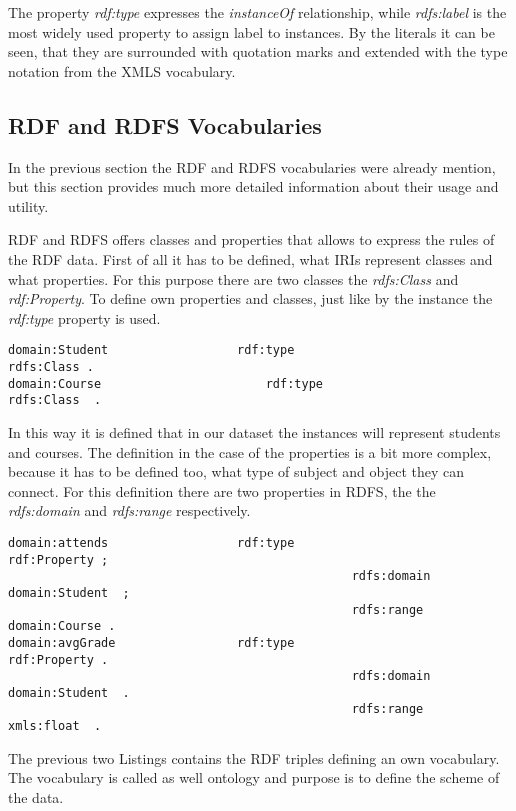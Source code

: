The property \textit{rdf:type} expresses the \textit{instanceOf} relationship, while \textit{rdfs:label} is the most widely used property to assign label to instances. By the literals it can be seen, that they are surrounded with quotation marks and extended with the type notation from the XMLS vocabulary.


\subsection{RDF and RDFS Vocabularies}


In the previous section the RDF and RDFS vocabularies were already mention, but this section provides much more detailed information about their usage and utility. 


RDF and RDFS offers classes and properties that allows to express the rules of the RDF data. First of all it has to be defined, what IRIs represent classes and what properties. For this purpose there are two classes the \textit{rdfs:Class} and \textit{rdf:Property}. To define own properties and classes, just like by the instance the \textit{rdf:type} property is used.

\begin{lstlisting}[basicstyle=\footnotesize, captionpos=b, caption=Class and property definition, label=lst:sparql,
frame=single]
domain:Student					rdf:type						rdfs:Class .
domain:Course						rdf:type						rdfs:Class	.
\end{lstlisting}

In this way it is defined that in our dataset the instances will represent students and courses. The definition in the case of the properties is a bit more complex, because it has to be defined too, what type of subject and object they can connect. For this definition there are two properties in RDFS, the  the \textit{rdfs:domain} and \textit{rdfs:range} respectively.

\begin{lstlisting}[basicstyle=\footnotesize, captionpos=b, caption=Property definition I., label=lst:sparql,
frame=single]
domain:attends					rdf:type						rdf:Property ;
												rdfs:domain					domain:Student	;
												rdfs:range					domain:Course .
domain:avgGrade					rdf:type						rdf:Property .
												rdfs:domain					domain:Student	.
												rdfs:range					xmls:float	.
\end{lstlisting}

The previous two Listings contains the RDF triples defining an own vocabulary. The vocabulary is called as well ontology and purpose is to define the scheme of the data. 

